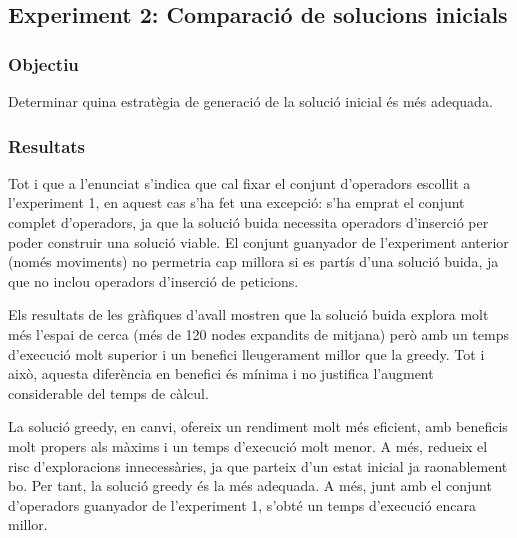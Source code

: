 \subsection{Experiment 2: Comparació de solucions inicials}

\vspace{0.75cm}

\subsubsection{Objectiu}
Determinar quina estratègia de generació de la solució inicial és més adequada.

\subsubsection{Resultats}

Tot i que a l’enunciat s’indica que cal fixar el conjunt d’operadors escollit a l’experiment 1, en aquest cas s’ha fet una excepció: s’ha emprat el conjunt complet d’operadors, ja que la solució buida necessita operadors d’inserció per poder construir una solució viable. El conjunt guanyador de l’experiment anterior (només moviments) no permetria cap millora si es partís d’una solució buida, ja que no inclou operadors d'inserció de peticions.

\vspace{0.2cm}

Els resultats de les gràfiques d'avall mostren que la solució buida explora molt més l’espai de cerca (més de 120 nodes expandits de mitjana) però amb un temps d’execució molt superior i un benefici lleugerament millor que la greedy. Tot i això, aquesta diferència en benefici és mínima i no justifica l’augment considerable del temps de càlcul.

\vspace{0.2cm}

La solució greedy, en canvi, ofereix un rendiment molt més eficient, amb beneficis molt propers als màxims i un temps d’execució molt menor. A més, redueix el risc d’exploracions innecessàries, ja que parteix d’un estat inicial ja raonablement bo. Per tant, la solució greedy és la més adequada. A més, junt amb el conjunt d'operadors guanyador de l'experiment 1, s'obté un temps d'execució encara millor.

\vspace{0.5cm}



\vspace{0.5cm}



\vspace{0.5cm}


